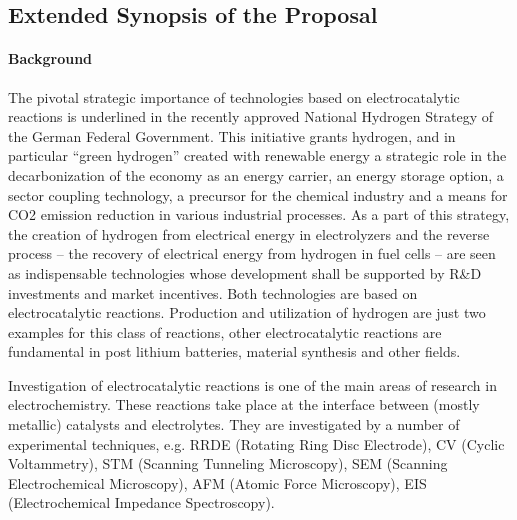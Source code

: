 \documentclass[a4paper,10pt]{article}
\begin{document}
\insertProjectHeader


\subsection*{Extended Synopsis of the Proposal}

\paragraph{Background}


The pivotal strategic importance of  technologies based on electrocatalytic reactions
is underlined in  the  recently  approved  National Hydrogen  Strategy of  the  German
Federal  Government. This initiative  grants  hydrogen,  and  in   particular  ``green
hydrogen''  created with  renewable  energy a  strategic  role in  the
decarbonization of the economy as an energy carrier, an energy storage
option, a  sector coupling  technology, a  precursor for  the chemical
industry  and a  means  for  CO2  emission reduction  in  various
industrial  processes. 
As  a part  of this  strategy, the  creation of
hydrogen  from  electrical energy  in  electrolyzers  and the  reverse
process --  the recovery  of electrical energy  from hydrogen  in fuel
cells -- are seen  as indispensable technologies whose development
shall be  supported by  R\&D investments  and market  incentives.
%
Both technologies are based  on electrocatalytic reactions. Production
and utilization  of hydrogen are just  two examples for this  class of
reactions, other  electrocatalytic reactions  are fundamental  in post
lithium  batteries,  material  synthesis  and  other  fields. 



Investigation of electrocatalytic  reactions is one of  the main areas
of research  in electrochemistry.  These  reactions take place  at the
interface between  (mostly metallic)  catalysts and  electrolytes.
They  are investigated  by a  number of  experimental techniques,  e.g.
RRDE    (Rotating   Ring    Disc   Electrode),   
CV  (Cyclic  Voltammetry),  
STM (Scanning Tunneling Microscopy), 
SEM (Scanning  Electrochemical Microscopy),
AFM (Atomic Force Microscopy), 
EIS (Electrochemical Impedance Spectroscopy).
\end{document}
